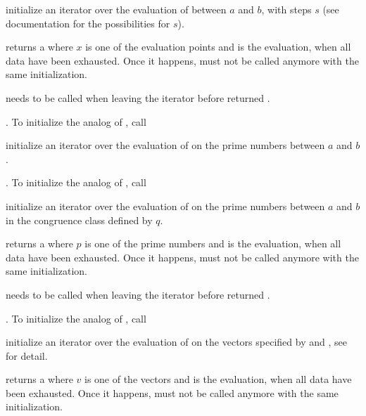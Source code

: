 initialize an iterator over the evaluation of  between $a$ and $b$,
with steps $s$ (see  documentation for the possibilities for $s$).


returns a  \kbd{[x,code(x)]} where $x$ is one of the evaluation
points and  is the evaluation,  when all data have
been exhausted. Once it happens,  must not be called
anymore with the same initialization.

 needs to be called when leaving
the iterator before  returned .

\item {}. To initialize the analog of
, call

initialize an iterator over the evaluation of  on the prime numbers
between $a$ and $b$.

\item {}. To initialize the analog of
, call

initialize an iterator over the evaluation of  on the prime numbers
between $a$ and $b$ in the congruence class defined by $q$.

 returns a 
\kbd{[p,code(p)]} where $p$ is one of the prime numbers and  is
the evaluation,  when all data have been exhausted. Once it happens,
must not be called anymore with the same initialization.

 needs to be called when leaving
the iterator before  returned .

\item {}. To initialize the analog of
, call

initialize an iterator over the evaluation of  on the vectors
specified by  and , see  for detail.

 returns a  \kbd{[v,code(v)]}
where $v$ is one of the vectors and  is the evaluation, 
when all data have been exhausted.  Once it happens, 
must not be called anymore with the same initialization.


